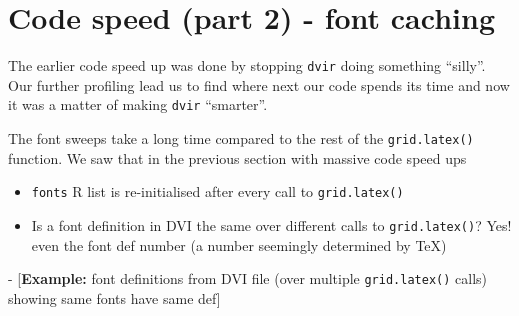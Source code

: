 \documentclass[]{article}
\begin{document}
\newpage{}

\section{Code speed (part 2) - font
caching}\label{code-speed-part-2---font-caching}

The earlier code speed up was done by stopping \texttt{dvir} doing
something ``silly''. Our further profiling lead us to find where next
our code spends its time and now it was a matter of making \texttt{dvir}
``smarter''.

The font sweeps take a long time compared to the rest of the
\texttt{grid.latex()} function. We saw that in the previous section with
massive code speed ups

\begin{itemize}
\item
  \texttt{fonts} R list is re-initialised after every call to
  \texttt{grid.latex()}
\item
  Is a font definition in DVI the same over different calls to
  \texttt{grid.latex()}? Yes! even the font def number (a number
  seemingly determined by TeX)
\end{itemize}

- {[}\textbf{Example:} font definitions from DVI file (over multiple
\texttt{grid.latex()} calls) showing same fonts have same def{]}
\end{document}
